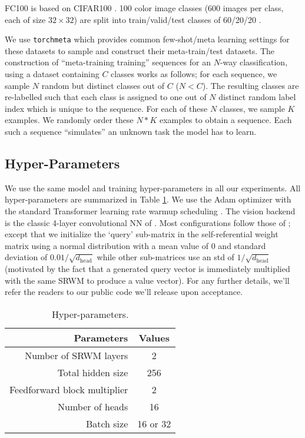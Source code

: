 \documentclass{article}
\begin{document}
FC100 is based on CIFAR100 \citep{krizhevsky}.
100 color image classes (600 images per class, each of size $32\times 32$) are split into train/valid/test classes of 60/20/20 \citep{OreshkinLL18}.

We use \texttt{torchmeta} \citep{deleu2019torchmeta} which provides common few-shot/meta learning settings for these datasets to sample and construct their meta-train/test datasets.
The construction of “meta-training training” sequences for an 
$N$-way classification, using a dataset containing $C$
 classes works as follows; for each sequence, we sample $N$
 random but distinct classes out of $C$
 ($N < C$). 
 The resulting classes are re-labelled such that each class is assigned to one out of $N$ 
 distinct random label index which is unique to the sequence. 
  For each of these $N$ classes, we sample $K$ examples.
  We randomly order these $N*K$ examples to obtain a sequence.
 Each such a sequence ``simulates'' an unknown task the model has to learn.

\subsection{Hyper-Parameters}
\label{app:hyp}
We use the same model and training hyper-parameters in all our experiments.
All hyper-parameters are summarized in Table \ref{tab:hyperparameters}.
We use the Adam optimizer with the standard Transformer learning rate warmup scheduling \citep{trafo}.
The vision backend is the classic 4-layer convolutional NN of \citet{VinyalsBLKW16}.
Most configurations follow those of \citet{IrieSCS22};
except that we initialize the `query' sub-matrix in the self-referential weight matrix using a normal distribution with a mean value of 0 and standard deviation of $0.01 / \sqrt{d_\text{head}}$ while other sub-matrices use an std of $1 / \sqrt{d_\text{head}}$ (motivated by the fact that a generated query vector is immediately multiplied with the same SRWM to produce a value vector).
For any further details, we'll refer the readers to our public code we'll release upon acceptance.

\begin{table}[h]
\caption{
Hyper-parameters.
}
\label{tab:hyperparameters}
\begin{center}
\begin{tabular}{rc}
\toprule
Parameters & Values  \\ \midrule
Number of SRWM layers & 2  \\
Total hidden size & 256 \\
Feedforward block multiplier & 2 \\
Number of heads & 16 \\
Batch size & 16 or 32 \\
\bottomrule
\end{tabular}
\end{center}
\end{table}
\end{document}
